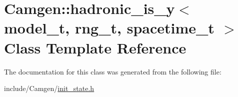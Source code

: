 \hypertarget{a00262}{}\section{Camgen\+:\+:hadronic\+\_\+is\+\_\+y$<$ model\+\_\+t, rng\+\_\+t, spacetime\+\_\+t $>$ Class Template Reference}
\label{a00262}


The documentation for this class was generated from the following file\+:\begin{DoxyCompactItemize}
\item 
include/\+Camgen/\hyperlink{a00669}{init\+\_\+state.\+h}\end{DoxyCompactItemize}
